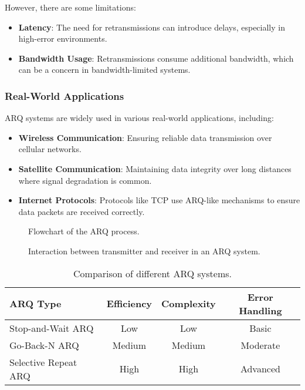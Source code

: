 However, there are some limitations:
\begin{itemize}[noitemsep]    \item \textbf{Latency}: The need for retransmissions can introduce delays, especially in high-error environments.
    \item \textbf{Bandwidth Usage}: Retransmissions consume additional bandwidth, which can be a concern in bandwidth-limited systems.
\end{itemize}

\subsubsection*{Real-World Applications}
ARQ systems are widely used in various real-world applications, including:
\begin{itemize}[noitemsep]    \item \textbf{Wireless Communication}: Ensuring reliable data transmission over cellular networks.
    \item \textbf{Satellite Communication}: Maintaining data integrity over long distances where signal degradation is common.
    \item \textbf{Internet Protocols}: Protocols like TCP use ARQ-like mechanisms to ensure data packets are received correctly.
\end{itemize}

\begin{figure}[h!]
    \centering
    \caption{Flowchart of the ARQ process.}
    \label{fig:arq-flowchart}
\end{figure}

\begin{figure}[h!]
    \centering
    \caption{Interaction between transmitter and receiver in an ARQ system.}
    \label{fig:arq-interaction}
\end{figure}

\begin{table}[h!]
    \centering
    \begin{tabular}{|l|c|c|c|}
        \hline
        \textbf{ARQ Type} & \textbf{Efficiency} & \textbf{Complexity} & \textbf{Error Handling} \\
        \hline
        Stop-and-Wait ARQ & Low & Low & Basic \\
        Go-Back-N ARQ & Medium & Medium & Moderate \\
        Selective Repeat ARQ & High & High & Advanced \\
        \hline
    \end{tabular}
    \caption{Comparison of different ARQ systems.}
    \label{tab:arq-comparison}
\end{table}

